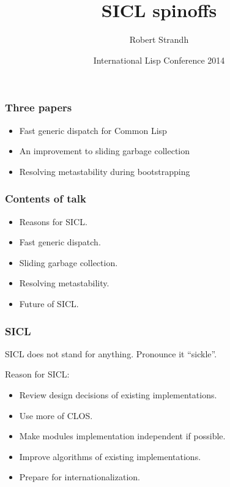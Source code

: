 \documentclass{beamer}
\title{SICL spinoffs}
\author{Robert Strandh\inst{1}}
\institute{\inst{1}Université de Bordeaux}
\date[ILC 2014]{International Lisp Conference 2014}
\begin{document}
\begin{frame}
  \titlepage
\end{frame}
\begin{frame}
\frametitle{Three papers}

\begin{itemize}
\item Fast generic dispatch for Common Lisp
\item An improvement to sliding garbage collection
\item Resolving metastability during bootstrapping
\end{itemize}

\end{frame}
\begin{frame}
\frametitle{Contents of talk}

\begin{itemize}
\item Reasons for SICL.
\item Fast generic dispatch.
\item Sliding garbage collection.
\item Resolving metastability.
\item Future of SICL.
\end{itemize}
\end{frame}
\begin{frame}
\frametitle{SICL}

SICL does not stand for anything.  Pronounce it ``sickle''.

Reason for SICL:

\begin{itemize}
\item Review design decisions of existing implementations.
\item Use more of CLOS.
\item Make modules implementation independent if possible.
\item Improve algorithms of existing implementations. 
\item Prepare for internationalization. 
\end{itemize}
\end{frame}
\end{document}
